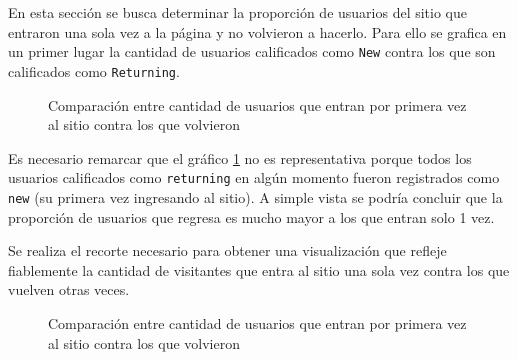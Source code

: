 \documentclass[a4paper]{article}
\begin{document}
En esta sección se busca determinar la proporción de usuarios del sitio que entraron una sola vez a la página y no volvieron a hacerlo. Para ello se grafica en un primer lugar la cantidad de usuarios calificados como \texttt{New} contra los que son calificados como \texttt{Returning}.

\begin{figure}[h!]
	\caption{Comparación entre cantidad de usuarios que entran por primera vez al sitio contra los que volvieron}
	\label{fig:newvsreturningfalse}
\end{figure}

Es necesario remarcar que el gráfico \ref{fig:newvsreturningfalse} no es representativa porque todos los usuarios calificados como \texttt{returning} en algún momento fueron registrados como \texttt{new} (su primera vez ingresando al sitio). A simple vista se podría concluir que la proporción de usuarios que regresa es mucho mayor a los que entran solo 1 vez. 

Se realiza el recorte necesario para obtener una visualización que refleje fiablemente la cantidad de visitantes que entra al sitio una sola vez contra los que vuelven otras veces. 

\begin{figure}[h!]
	\caption{Comparación entre cantidad de usuarios que entran por primera vez al sitio contra los que volvieron}
	\label{fig:newvsreturning}
\end{figure}
\end{document}
